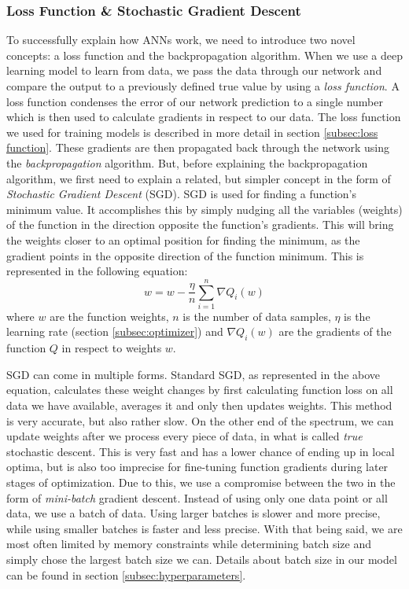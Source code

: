 \documentclass[times, utf8, diplomski, english]{fer_eng}
\begin{document}
\subsubsection{Loss Function \& Stochastic Gradient Descent}
\label{subsubsec: loss function and stochastic gradient descent}

To successfully explain how ANNs work, we need to introduce two novel concepts: a loss function and the backpropagation algorithm. When we use a deep learning model to learn from data, we pass the data through our network and compare the output to a previously defined true value by using a \textit{loss function}. A loss function condenses the error of our network prediction to a single number which is then used to calculate gradients in respect to our data. The loss function we used for training models is described in more detail in section \ref{subsec:loss function}. These gradients are then propagated back through the network using the \textit{backpropagation} algorithm. But, before explaining the backpropagation algorithm, we first need to explain a related, but simpler concept in the form of \textit{Stochastic Gradient Descent} (SGD). SGD is used for finding a function's minimum value. It accomplishes this by simply nudging all the variables (weights) of the function in the direction opposite the function's gradients. This will bring the weights closer to an optimal position for finding the minimum, as the gradient points in the opposite direction of the function minimum. This is represented in the following equation:
\[ w = w - \frac{\eta}{n} \sum_{i=1}^n \nabla Q_i(w) \]
where $w$ are the function weights, $n$ is the number of data samples, $\eta$ is the learning rate (section \ref{subsec:optimizer}) and $\nabla Q_i(w)$ are the gradients of the function $Q$ in respect to weights $w$.

SGD can come in multiple forms. Standard SGD, as represented in the above equation, calculates these weight changes by first calculating function loss on all data we have available, averages it and only then updates weights. This method is very accurate, but also rather slow. On the other end of the spectrum, we can update weights after we process every piece of data, in what is called \textit{true} stochastic descent. This is very fast and has a lower chance of ending up in local optima, but is also too imprecise for fine-tuning function gradients during later stages of optimization. Due to this, we use a compromise between the two in the form of \textit{mini-batch} gradient descent. Instead of using only one data point or all data, we use a batch of data. Using larger batches is slower and more precise, while using smaller batches is faster and less precise. With that being said, we are most often limited by memory constraints while determining batch size and simply chose the largest batch size we can. Details about batch size in our model can be found in section \ref{subsec:hyperparameters}.
\end{document}
